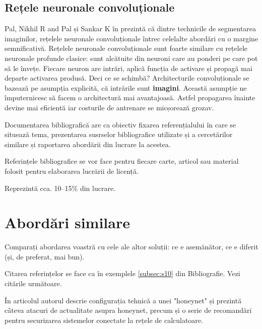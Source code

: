 \subsection{Rețele neuronale convoluționale}
Pal, Nikhil R and Pal și Sankar K în \cite{pal1993review} prezintă că dintre technicile de segmentarea imaginilor, rețelele neuronale convoluționale întrec celelalte abordări cu o margine semnificativă.\newline
Rețelele neuronale convoluționale sunt foarte similare cu rețelele neuronale profunde clasice: sunt alcătuite din neuroni care au ponderi pe care pot să le învețe. Fiecare neuron are intrări, aplică funcția de activare și propagă mai departe activarea produsă.\newline
Deci ce se schimbă? Architecturile convoluționale se bazează pe asumpția explicită, că intrările sunt \textbf{imagini}. Această asumpție ne împuternicesc să facem o architectură mai avantajoasă. Astfel propagarea înainte devine mai eficientă iar costurile de antrenare se micșorează grozav.


Documentarea bibliografică are ca obiectiv fixarea referențialului în care se situează tema, prezentarea susrselor bibliografice utilizate și a cercetărilor similare și raportarea abordării din lucrare la acestea.

Referințele bibliografice se vor face pentru fiecare carte, articol sau material folosit pentru elaborarea lucrării de licență. 

Reprezintă cca. 10--15\% din lucrare.


\section{Abordări similare}

Comparați abordarea voastră cu cele ale altor soluții: ce e asemănător, ce e diferit (și, de preferat, mai bun). 

Citarea referințelor se face ca în exemplele \ref{subsec:s10} din Bibliografie. 
Vezi citările următoare.

În articolul \cite{Antoniou04} autorul descrie configurația tehnică a unei "honeynet" și prezintă câteva atacuri de actualitate asupra honeynet, precum și o serie de recomandări pentru securizarea sistemelor conectate la rețele de calculatoare.

